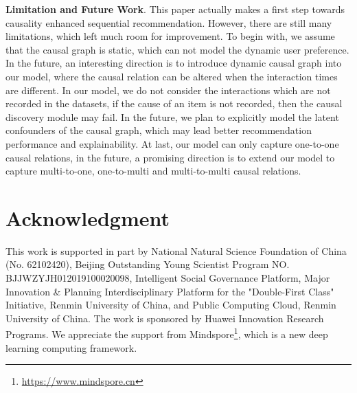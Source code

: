 \documentclass[conference]{IEEEtran}
\theoremstyle{definition}
\theoremstyle{theorem}
\theoremstyle{proof}
\theoremstyle{remark}
\begin{document}
\textbf{Limitation and Future Work}. 
{This paper actually makes a first step towards causality enhanced sequential recommendation.
However, there are still many limitations, which left much room for improvement.
To begin with, we assume that the causal graph is static, which can not model the dynamic user preference.
In the future, an interesting direction is to introduce dynamic causal graph into our model, where the causal relation can be altered when the interaction times are different.
In our model, we do not consider the interactions which are not recorded in the datasets, if the cause of an item is not recorded, then the causal discovery module may fail. In the future, we plan to explicitly model the latent confounders of the causal graph, which may lead better recommendation performance and explainability.
At last, our model can only capture one-to-one causal relations, in the future, a promising direction is to extend our model to capture multi-to-one, one-to-multi and multi-to-multi causal relations.}



\section*{Acknowledgment}
This work is supported in part by National Natural Science Foundation of China (No. 62102420), Beijing Outstanding Young Scientist Program NO. BJJWZYJH012019100020098, Intelligent Social Governance Platform, Major Innovation \& Planning Interdisciplinary Platform for the "Double-First Class" Initiative, Renmin University of China, and Public Computing Cloud, Renmin University of China. 
The work is sponsored by Huawei Innovation Research Programs. We appreciate the support from Mindspore\footnote{\url{https://www.mindspore.cn}}, which is a new deep learning computing framework.




\balance

\end{document}
